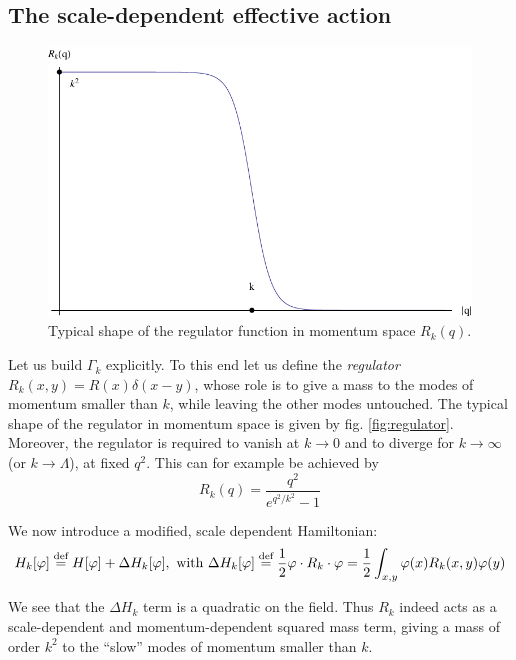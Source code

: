 \subsection{The scale-dependent effective action}

\begin{figure}[htp]
\begin{center}
\includegraphics[scale=0.7]{img/chap2/regulator.pdf}
\caption{Typical shape of the regulator function in momentum space $R_k(q)$.}
\label{fig:regulator}
\end{center}
\end{figure}

Let us build $\Gamma_k$ explicitly.  To this end let us define the \textit{regulator} $R_k(x,y) = R(x) \delta(x-y)$, whose role is to give a mass to the modes of momentum smaller than $k$, while leaving the other modes untouched.
The typical shape of the regulator in momentum space is given by fig. \eqref{fig:regulator}. Moreover, the regulator is required to vanish at $k \rightarrow 0$ and to diverge for $k \rightarrow \infty$ (or $k \rightarrow \Lambda$), at fixed $q^2$. This can for example be achieved by
\begin{equation}
R_k(q) = \frac{q^2}{e^{q^2/k^2} - 1}
\end{equation}

We now introduce a modified, scale dependent Hamiltonian:
\begin{equation}
H_k[\varphi]  \overset{\text{def}}{=}  H[\varphi] + \Delta H_k[\varphi], \text{~with~} \Delta H_k[\varphi]  \overset{\text{def}}{=}  \frac{1}{2} \varphi \cdot R_k \cdot \varphi = \frac{1}{2} \int_{x,y} \varphi(x) R_k(x,y) \varphi(y)
\end{equation}

We see that the $\Delta H_k$ term is a quadratic on the field. Thus $R_k$ indeed acts as a scale-dependent and momentum-dependent squared mass term, giving a mass of order $k^2$ to the ``slow'' modes of momentum smaller than $k$.

